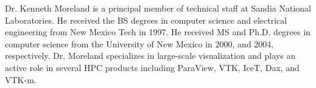 \documentclass[letterpaper,twocolumn,fleqn]{article}
\begin{document}

\small


\begin{biography}
\noindent
Dr. Kenneth Moreland is a principal member of technical staff at Sandia
National Laboratories. He received the BS degrees in computer science and
electrical engineering from New Mexico Tech in 1997. He received MS and
Ph.D. degrees in computer science from the University of New Mexico in
2000, and 2004, respectively. Dr. Moreland specializes in large-scale
visualization and plays an active role in several HPC products including
ParaView, VTK, IceT, Dax, and VTK-m.
\end{biography}
\end{document}
